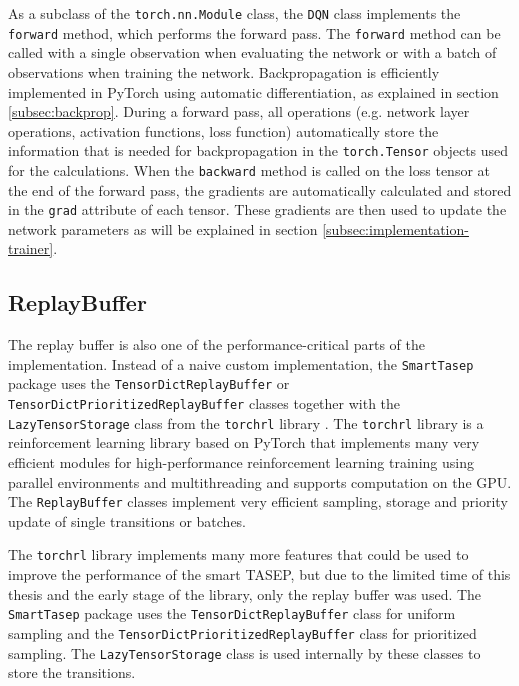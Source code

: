 As a subclass of the \texttt{torch.nn.Module} class, the \texttt{DQN} class implements the \texttt{forward} method, which performs the forward pass. The \texttt{forward} method can be called with a single observation when evaluating the network or with a batch of observations when training the network. Backpropagation is efficiently implemented in PyTorch using automatic differentiation, as explained in section \ref{subsec:backprop}. During a forward pass, all operations (e.g. network layer operations, activation functions, loss function) automatically store the information that is needed for backpropagation in the \texttt{torch.Tensor} objects used for the calculations. When the \texttt{backward} method is called on the loss tensor at the end of the forward pass, the gradients are automatically calculated and stored in the \texttt{grad} attribute of each tensor. These gradients are then used to update the network parameters as will be explained in section \ref{subsec:implementation-trainer}.



\subsection{ReplayBuffer}
\label{subsec:implementation-replaybuffer}
The replay buffer is also one of the performance-critical parts of the implementation. Instead of a naive custom implementation, the \texttt{SmartTasep} package uses the \texttt{TensorDictReplayBuffer} or \texttt{TensorDictPrioritizedReplayBuffer} classes together with the \texttt{LazyTensorStorage} class from the \texttt{torchrl} library \cite{bou_torchrl_2023}. The \texttt{torchrl} library is a reinforcement learning library based on PyTorch that implements many very efficient modules for high-performance reinforcement learning training using parallel environments and multithreading and supports computation on the GPU. The \texttt{ReplayBuffer} classes implement very efficient sampling, storage and priority update of single transitions or batches. 


The \texttt{torchrl} library implements many more features that could be used to improve the performance of the smart TASEP, but due to the limited time of this thesis and the early stage of the library, only the replay buffer was used. The \texttt{SmartTasep} package uses the \texttt{TensorDictReplayBuffer} class for uniform sampling and the \texttt{TensorDictPrioritized\-ReplayBuffer} class for prioritized sampling. The \texttt{LazyTensorStorage} class is used internally by these classes to store the transitions. 




